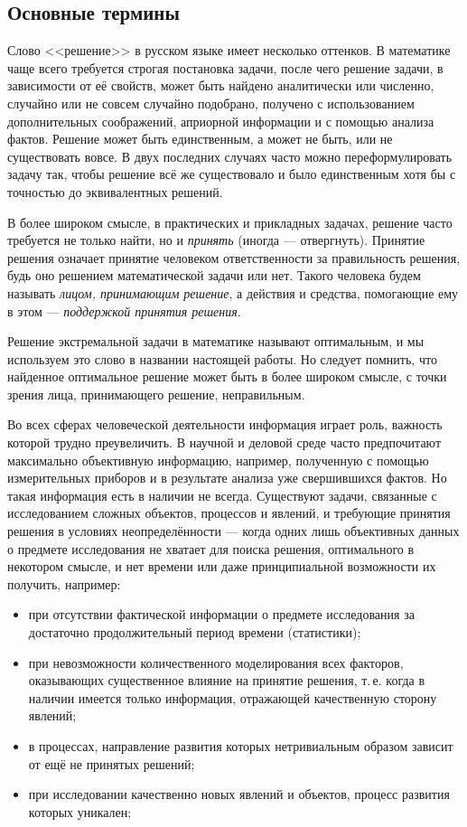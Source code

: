 
\subsection{Основные термины}

Слово <<решение>> в русском языке имеет несколько оттенков. В математике чаще всего требуется строгая постановка задачи, после чего решение задачи, в зависимости от её свойств, может быть найдено аналитически или численно, случайно или не совсем случайно подобрано, получено с использованием дополнительных соображений,  априорной информации и с помощью анализа фактов. Решение может быть единственным, а может не быть, или не существовать вовсе. В двух последних случаях часто можно переформулировать задачу так, чтобы решение всё же существовало и было единственным хотя бы с точностью до эквивалентных решений. 

В более широком смысле, в практических и прикладных задачах, решение часто требуется не только найти, но и {\sl принять} (иногда --- отвергнуть). Принятие решения означает принятие человеком ответственности за правильность решения, будь оно решением математической задачи или нет. Такого человека будем называть {\sl лицом, принимающим решение}, а действия и средства, помогающие ему в этом ---  {\sl поддержкой принятия решения}. 

Решение экстремальной задачи в математике называют оптимальным, и мы используем это слово в названии настоящей работы. Но следует помнить, что найденное оптимальное решение может быть в более широком смысле, с точки зрения лица, принимающего решение, неправильным. 

Во всех сферах человеческой деятельности информация играет роль, важность которой трудно преувеличить. В научной и деловой среде часто предпочитают максимально объективную информацию, например, полученную с помощью измерительных приборов и в результате анализа уже свершившихся фактов. Но такая информация есть в наличии не всегда. Существуют задачи, связанные с исследованием сложных объектов, процессов и явлений, и требующие принятия решения в условиях неопределённости --- когда одних лишь объективных данных о предмете исследования не хватает для поиска решения, оптимального в некотором смысле, и нет времени или даже принципиальной возможности их  получить, например: 
\begin{itemize}
 \item при отсутствии фактической информации о предмете исследования за достаточно продолжительный период времени (статистики);
 \item при невозможности количественного моделирования всех факторов, оказывающих существенное влияние на принятие решения, т.\,е. когда в наличии имеется только информация, отражающей качественную сторону явлений; 
 \item в процессах, направление развития которых нетривиальным образом зависит от ещё не принятых решений;
 \item при исследовании качественно новых явлений и объектов, процесс развития которых уникален;
\end{itemize}

